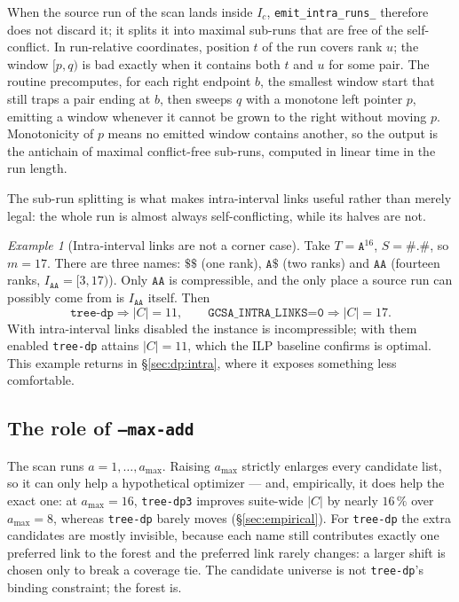\documentclass[11pt,a4paper]{article}
\theoremstyle{definition}
\theoremstyle{plain}
\theoremstyle{remark}
\newtheorem{example}{Example}
\begin{document}
When the source run of the scan lands inside $I_c$,
\texttt{emit\_intra\_runs\_} therefore does not discard it; it splits it
into maximal sub-runs that are free of the self-conflict. In run-relative
coordinates, position $t$ of the run covers rank $u$; the window
$[p,q)$ is bad exactly when it contains both $t$ and $u$ for some pair.
The routine precomputes, for each right endpoint $b$, the smallest window
start that still traps a pair ending at $b$, then sweeps $q$ with a
monotone left pointer $p$, emitting a window whenever it cannot be grown
to the right without moving $p$. Monotonicity of $p$ means no emitted
window contains another, so the output is the antichain of maximal
conflict-free sub-runs, computed in linear time in the run length.

The sub-run splitting is what makes intra-interval links useful rather
than merely legal: the whole run is almost always self-conflicting,
while its halves are not.

\begin{example}[Intra-interval links are not a corner case]
\label{ex:a16}
Take $T = \mathtt{A}^{16}$, $S = \mathtt{\#.\#}$, so $m = 17$. There are
three names: $\mathtt{\$\$}$ (one rank), $\mathtt{A\$}$ (two ranks) and
$\mathtt{AA}$ (fourteen ranks, $I_{\mathtt{AA}} = [3,17)$). Only
$\mathtt{AA}$ is compressible, and the only place a source run can
possibly come from is $I_{\mathtt{AA}}$ itself. Then
\[
  \texttt{tree-dp} \Rightarrow |C| = 11,
  \qquad
  \texttt{GCSA\_INTRA\_LINKS=0} \Rightarrow |C| = 17 .
\]
With intra-interval links disabled the instance is incompressible; with
them enabled \texttt{tree-dp} attains $|C| = 11$, which the ILP
baseline confirms is optimal. This example returns in
\S\ref{sec:dp:intra}, where it exposes something less comfortable.
\end{example}

\subsection{The role of \texttt{--max-add}}

The scan runs $a = 1, \dots, a_{\max}$. Raising $a_{\max}$ strictly
enlarges every candidate list, so it can only help a hypothetical
optimizer --- and, empirically, it does help the exact one: at
$a_{\max} = 16$, \texttt{tree-dp3} improves suite-wide $|C|$ by nearly
$16\,\%$ over $a_{\max} = 8$, whereas \texttt{tree-dp} barely moves
(\S\ref{sec:empirical}). For \texttt{tree-dp} the extra candidates are
mostly invisible, because each name still contributes exactly one
preferred link to the forest and the preferred link rarely changes: a
larger shift is chosen only to break a coverage tie. The candidate
universe is not \texttt{tree-dp}'s binding constraint; the forest is.
\end{document}
